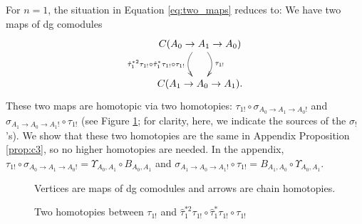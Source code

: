 For $n=1$, the situation in Equation 
\ref{eq:two_maps} reduces to: 
We have two maps of dg comodules
$$
\xymatrix{
C(A_0 \to A_1 \to A_0) 
 \ar@/^1pc/[d]^{\tau_{1!}}
 \ar@/_1pc/[d]_{\hat{\tau}_1^{*2} \tau_{1!}\circ
   \hat{\tau}_1^*\tau_{1!}\circ \tau_{1!}}\\
C(A_1 \to A_0 \to A_1).
}
$$
These two maps are homotopic via 
two homotopies: 
$\tau_{1!} \circ \sigma_{A_0 \to A_1 \to A_0!}$ 
and 
$\sigma_{A_1 \to A_0 \to A_1!} \circ \tau_{1!}$ 
(see Figure \ref{fig:two_homotopies_1}; 
for clarity, here, we indicate the sources 
of the $\sigma_!$'s). We show that these two 
homotopies are the same in Appendix Proposition 
\ref{prop:c3}, so no higher homotopies are 
needed. In the appendix, $\tau_{1!} \circ 
\sigma_{A_0 \to A_1 \to A_0!} = \Upsilon_{A_0,A_1} 
\circ B_{A_0,A_1}$ and 
$\sigma_{A_1 \to A_0 \to A_1!} \circ 
\tau_{1!} = B_{A_1,A_0} \circ \Upsilon_{A_0,A_1}$.
%
\begin{figure}%
\xymatrixrowsep{4pc}
\centerline{}
\caption{Two homotopies between 
$\tau_{1!}$ and $\hat{\tau}_1^{*2} \tau_{1!}\circ
\hat{\tau}_1^*\tau_{1!}\circ \tau_{1!}$}
\label{fig:two_homotopies_1}
Vertices are maps of dg comodules and 
arrows are chain homotopies.
\end{figure}
